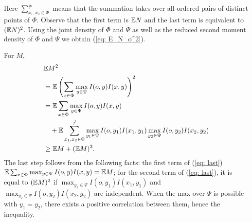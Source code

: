 Here $\sum_{x_1,x_2\in\Phi}^{\neq}$ means that the summation takes over all ordered pairs of distinct points of $\Phi$. Observe that the first term is $\mathbb{E} N$ and the last term is equivalent to $(\mathbb{E} N)^2$. Using the joint density of $\Phi$ and $\Psi$ as well as the reduced second moment density of $\Phi$ and $\Psi$ we obtain (\ref{eq: E_N_o^2}).   

   For $M$,
   \begin{align}
        &\mathbb{E} M^2\nonumber \\
        &= \mathbb{E} \left(\sum_{x \in\Phi} \max_{y\in\Psi}I(o,y)I(x,y) \right)^2\nonumber\\
            & = \mathbb{E} \sum_{x\in\Phi} \max_{y\in\Psi}I(o,y)I(x,y) \nonumber \\
            &\quad+ \mathbb{E}\sum_{x_1,x_2\in\Phi}^{\neq}\max_{y_1\in\Psi}I(o,y_1)I(x_1,y_1)\max_{y_2\in\Psi}I(o,y_2)I(x_2,y_2)\label{eq: last}\\
            & \geq \mathbb{E} M + (\mathbb{E} M)^2.\nonumber
   \end{align}
   The last step follows from the following facts: the first term of (\ref{eq: last}) $\mathbb{E} \sum_{x\in\Phi} \max_{y\in\Psi}I(o,y)I(x,y) = \mathbb{E} M$; for the second term of  (\ref{eq: last}), it is equal to $(\mathbb{E} M)^2$ if  
$\max_{y_1\in\Psi}I(o,y_1)I(x_1,y_1)$ and $\max_{y_2\in\Psi}I(o,y_2)I(x_2,y_2)$ are independent. When the max over $\Psi$ is possible with $y_1=y_2$, there exists a positive correlation between them, hence the inequality.


